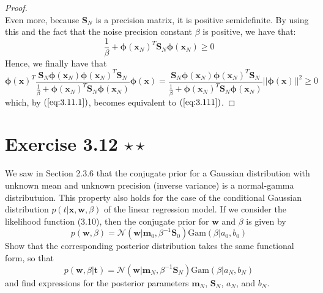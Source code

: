 \begin{proof}
\[    \] 
    Even more, because $\mathbf{S}_N$ is a precision matrix, it is 
    positive semidefinite. By using this and the fact that the noise
    precision constant $\beta$ is positive, we have that:
    \[
        \frac{1}{\beta} + \bm{\phi}(\mathbf{x}_N)^T\mathbf{S}_N\bm{\phi}(\mathbf{x}_N) \geq 0
    \] 
    Hence, we finally have that 
    \[
        \bm{\phi}(\mathbf{x})^T
        \frac{\mathbf{S}_N\bm{\phi}(\mathbf{x}_N)\bm{\phi}(\mathbf{x}_N)^T\mathbf{S}_N}
        {\frac{1}{\beta} + \bm{\phi}(\mathbf{x}_N)^T\mathbf{S}_N\bm{\phi}(\mathbf{x}_N)}
        \bm{\phi}(\mathbf{x}) 
        = \frac{\mathbf{S}_N\bm{\phi}(\mathbf{x}_N)\bm{\phi}(\mathbf{x}_N)^T\mathbf{S}_N}
          {\frac{1}{\beta} + \bm{\phi}(\mathbf{x}_N)^T\mathbf{S}_N\bm{\phi}(\mathbf{x}_N)}
          ||\bm{\phi}(\mathbf{x})||^2 \geq 0
    \] 
    which, by $(\ref{eq:3.11.1})$, becomes equivalent to $(\ref{eq:3.111})$.
\end{proof}

\section*{Exercise 3.12 $\star \star$}
We saw in Section 2.3.6 that the conjugate prior for a Gaussian distribution
with unknown mean and unknown precision (inverse variance) is a normal-gamma
distributuion. This property also holds for the case of the conditional
Gaussian distribution $p(t | \mathbf{x}, \mathbf{w}, \beta)$ of the linear
regression model. If we consider the likelihood function (3.10), then
the conjugate prior for $\mathbf{w}$ and $\beta$ is given by
\begin{equation*}
    p(\mathbf{w}, \beta) 
    = \mathcal{N}(\mathbf{w} | \mathbf{m}_0, \beta^{-1}\mathbf{S}_0) \text{Gam}(\beta | a_0, b_0)
    \tag{3.112}\label{eq:3.112}
\end{equation*}
Show that the corresponding posterior distribution takes the same functional
form, so that 
\begin{equation*}
    p(\mathbf{w}, \beta | \mathbf{t}) 
    = \mathcal{N}(\mathbf{w} | \mathbf{m}_N, \beta^{-1} \mathbf{S}_N) \text{Gam}(\beta | a_N, b_N)
    \tag{3.113}\label{eq:3.113}
\end{equation*}
and find expressions for the posterior parameters $\mathbf{m}_N$, $\mathbf{S}_N$, $a_N$, 
and $b_N$.

\vspace{1em}


